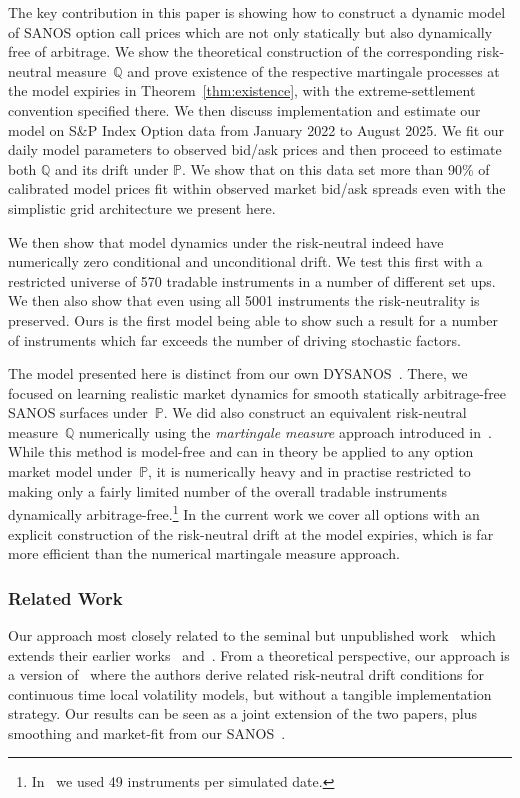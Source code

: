 \documentclass[11pt]{article}
\newcommand{\Q}{\mathbb Q}
\newcommand{\PP}{\mathbb P}
\theoremstyle{plain}
\theoremstyle{definition}
\theoremstyle{remark}
\begin{document}
The key
contribution in this paper is showing how to construct a dynamic model of SANOS option call prices which are not only statically but
also dynamically free of arbitrage. We show the theoretical construction of the corresponding risk-neutral measure~$\mathbb{Q}$
and prove existence of the respective martingale processes at the model expiries in Theorem~\ref{thm:existence},
with the extreme-settlement convention specified there. We then discuss implementation
and estimate our model on S\&P Index Option data from January 2022 to August 2025. We fit our daily model parameters to observed bid/ask prices and then proceed to
estimate both $\Q$ and its drift under $\PP$. We show that
on this data set more than 90\% of calibrated
model prices fit within observed market bid/ask spreads even with the simplistic grid architecture we present here.

We then show that model dynamics under the risk-neutral indeed have numerically zero conditional and unconditional drift. We test this first
with a restricted universe of 570 tradable instruments in a number of different set ups. We then also show that even using all 5001 instruments
the risk-neutrality is preserved. Ours is the first model being able to show such a result for a number of instruments which far exceeds
the number of driving stochastic factors.

The model presented here is distinct from our own DYSANOS~\cite{DYSANOS2026}. There, we focused on learning
realistic market dynamics for smooth statically arbitrage-free SANOS
surfaces under~$\PP$.
We did also construct an equivalent risk-neutral measure~$\Q$ numerically using the \emph{martingale measure} approach introduced in~\cite{removedrift}.
While this method is model-free and can in theory be applied to any option market model under~$\PP$, it is numerically heavy and in practise
restricted to making only a fairly limited number of the overall tradable instruments
dynamically arbitrage-free.\footnote{In~\cite{DYSANOS2026} we used 49 instruments per simulated date.} In the current work we cover all options with
an explicit construction of the risk-neutral drift at the model expiries, which is far more efficient than the numerical martingale measure approach.

\subsubsection*{Related Work}

Our approach most closely related to the seminal but unpublished work~\cite{Wissel2007}
which extends their earlier works~\cite{SchweizerWissel2008} and~\cite{Schweizer2007}. From a
theoretical perspective, our approach is a version of~\cite{CarmonaNadtochiy2008} where
the authors derive related risk-neutral drift conditions for continuous time local volatility models, 
but without a tangible implementation strategy. Our results
can be seen as a joint extension of the two papers, plus  smoothing and market-fit from our SANOS~\cite{SANOS2026}. 
\end{document}
